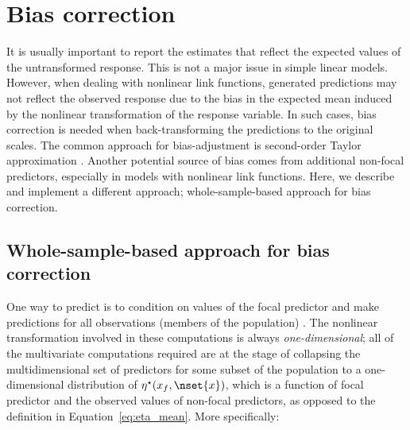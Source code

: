 
\section{Bias correction}

It is usually important to report the estimates that reflect the expected values of the untransformed response. This is not a major issue in simple linear models. However, when dealing with nonlinear link functions,  generated predictions may not reflect the observed response due to the bias in the expected mean induced by the nonlinear transformation of the response variable. In such cases, bias correction is needed when back-transforming the predictions to the original scales. The common approach for bias-adjustment is second-order Taylor approximation \citep{lenth2018package, duursma2003bias}. Another potential source of bias comes from additional non-focal predictors, especially in models with nonlinear link functions. Here, we describe and implement a different approach; whole-sample-based approach for bias correction.


\subsection{Whole-sample-based approach for bias correction}

One way to predict is to condition on values of the focal predictor and make predictions for all observations (members of the population) \citep{hanmer2013behind}. The nonlinear transformation involved in these computations is always \emph{one-dimensional}; all of the multivariate computations required are at the stage of collapsing the multidimensional set of predictors for some subset of the population to a one-dimensional distribution of $\eta^\star(x_f, \nset{x})$, which is a function of focal predictor and the observed values of non-focal predictors, as opposed to the definition in Equation~\ref{eq:eta_mean}. More specifically:


